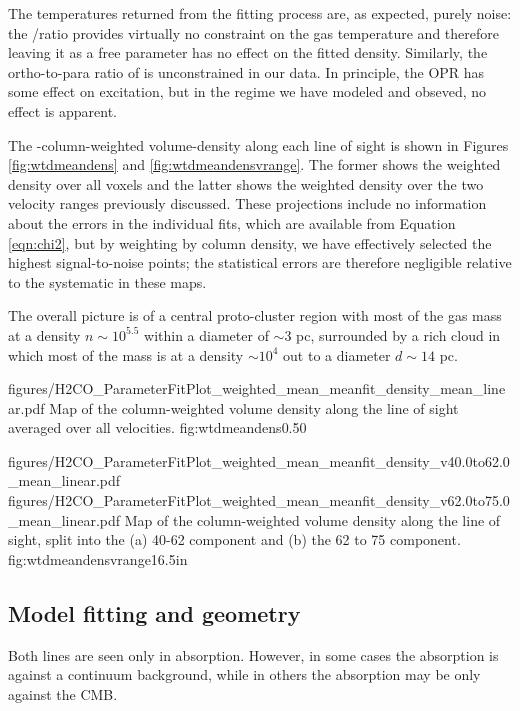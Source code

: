 The temperatures returned from the fitting process are, as expected, purely
noise: the \formaldehyde \oneone/\twotwo ratio provides virtually no constraint
on the gas temperature and therefore leaving it as a free parameter has no
effect on the fitted density.  Similarly, the ortho-to-para ratio of \hh is
unconstrained in our data.  In principle, the \hh OPR has some effect on
\formaldehyde excitation, but in the regime we have modeled and obseved, no
effect is apparent.


The \ortho-column-weighted volume-density along each line of sight is shown in
Figures \ref{fig:wtdmeandens} and \ref{fig:wtdmeandensvrange}.  The former
shows the weighted density over all voxels and the latter shows the weighted
density over the two velocity ranges previously discussed.  These projections
include no information about the errors in the individual fits, which are
available from Equation \ref{eqn:chi2}, but by weighting by column density, we
have effectively selected the highest signal-to-noise points; the statistical
errors are therefore negligible relative to the systematic in these maps.



The overall picture is of a central proto-cluster region with most of the gas
mass at a density $n\sim10^{5.5}$ \percc within a diameter of $\sim3$ pc, surrounded
by a rich cloud in which most of the mass is at a density $\sim10^4$ \percc out
to a diameter $d\sim14$ pc.


\Figure
{figures/H2CO_ParameterFitPlot_weighted_mean_meanfit_density_mean_linear.pdf}
{Map of the column-weighted volume density along the line of sight averaged
over all velocities.}
{fig:wtdmeandens}{0.5}{0}

\FigureTwoAA
{figures/H2CO_ParameterFitPlot_weighted_mean_meanfit_density_v40.0to62.0_mean_linear.pdf}
{figures/H2CO_ParameterFitPlot_weighted_mean_meanfit_density_v62.0to75.0_mean_linear.pdf}
{Map of the column-weighted volume density along the line of sight, split into 
the (a) 40-62 \kms component and (b) the 62 to 75 \kms component.}
{fig:wtdmeandensvrange}{1}{6.5in}

\subsection{Model fitting and geometry}
Both \formaldehyde lines are seen only in absorption.  However, in some cases
the absorption is against a continuum background, while in others the
absorption may be only against the CMB.

